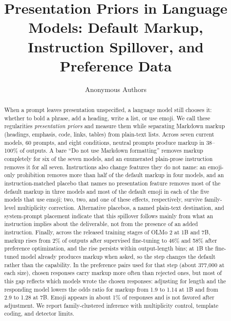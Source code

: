\documentclass[acmsmall,screen,review,anonymous]{acmart}
\begin{document}
\title[Presentation Priors in Language Models]{Presentation Priors in Language Models: Default Markup, Instruction Spillover, and Preference Data}

\author{Anonymous Authors}

\begin{abstract}
When a prompt leaves presentation unspecified, a language model still chooses it: whether to bold a phrase, add a heading, write a list, or use emoji. We call these regularities \emph{presentation priors} and measure them while separating Markdown markup (headings, emphasis, code, links, tables) from plain-text lists. Across seven current models, 60 prompts, and eight conditions, neutral prompts produce markup in 38--100\% of outputs. A bare ``Do not use Markdown formatting'' removes markup completely for six of the seven models, and an enumerated plain-prose instruction removes it for all seven. Instructions also change features they do not name: an emoji-only prohibition removes more than half of the default markup in four models, and an instruction-matched placebo that names no presentation feature removes most of the default markup in three models and most of the default emoji in each of the five models that use emoji; two, two, and one of these effects, respectively, survive family-level multiplicity correction. Alternative placebos, a named plain-text destination, and system-prompt placement indicate that this spillover follows mainly from what an instruction implies about the deliverable, not from the presence of an added instruction. Finally, across the released training stages of OLMo 2 at 1B and 7B, markup rises from 2\% of outputs after supervised fine-tuning to 46\% and 58\% after preference optimization, and the rise persists within output-length bins; at 1B the fine-tuned model already produces markup when asked, so the step changes the default rather than the capability. In the preference pairs used for that step (about 377,000 at each size), chosen responses carry markup more often than rejected ones, but most of this gap reflects which models wrote the chosen responses: adjusting for length and the responding model lowers the odds ratio for markup from 1.9 to 1.14 at 1B and from 2.9 to 1.28 at 7B. Emoji appears in about 1\% of responses and is not favored after adjustment. We report family-clustered inference with multiplicity control, template coding, and detector limits.
\end{abstract}
\end{document}
